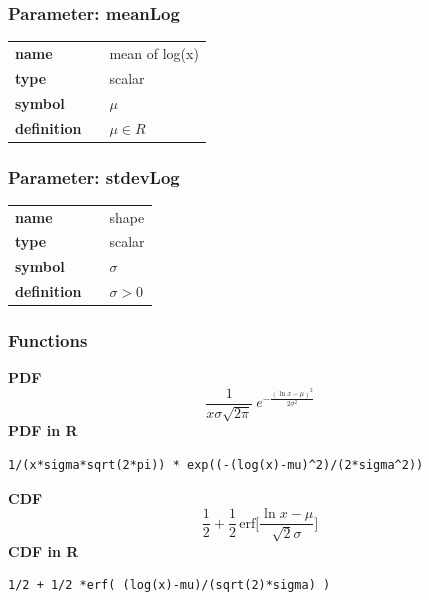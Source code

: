 \subsubsection*{Parameter: meanLog}

\noindent\begin{tabular}{p{2cm}cl}
\textbf{name} & & mean of log(x) \\
\textbf{type} & & scalar \\
\textbf{symbol} & & $\mu$  \\
\textbf{definition} & & $\mu \in R$
\end{tabular}
\subsubsection*{Parameter: stdevLog}

\noindent\begin{tabular}{p{2cm}cl}
\textbf{name} & & shape \\
\textbf{type} & & scalar \\
\textbf{symbol} & & $\sigma$  \\
\textbf{definition} & & $\sigma > 0$
\end{tabular}
\subsubsection*{Functions}

\smallskip \noindent \hspace{.2cm} \textbf{PDF} 
\begin{equation*}\frac{1}{x\sigma\sqrt{2\pi}}\ e^{-\frac{\left(\ln x-\mu\right)^2}{2\sigma^2}}\end{equation*}
\smallskip \noindent \hspace{.2cm} \textbf{PDF in R}  
\begin{verbatim}1/(x*sigma*sqrt(2*pi)) * exp((-(log(x)-mu)^2)/(2*sigma^2))\end{verbatim}
\smallskip \noindent \hspace{.2cm} \textbf{CDF} 
\begin{equation*}\frac12 + \frac12\,\text{erf}\Big[\frac{\ln x-\mu}{\sqrt{2}\sigma}\Big]\end{equation*}
\smallskip \noindent \hspace{.2cm} \textbf{CDF in R} 
\begin{verbatim}1/2 + 1/2 *erf( (log(x)-mu)/(sqrt(2)*sigma) )\end{verbatim}
\smallskip

